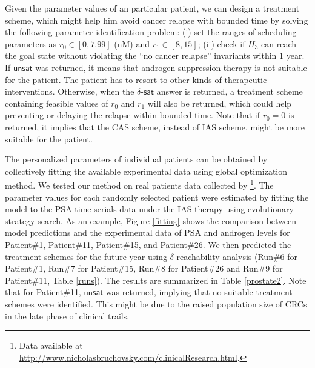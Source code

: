 Given the parameter values of an particular patient, we can design a treatment scheme, which might help him avoid cancer relapse with bounded time by solving the following parameter identification problem: (i) set the ranges of scheduling parameters as $r_0 \in [0,7.99]$ (nM) and $r_1 \in [8,15]$; (ii) check if $H_3$ can reach the goal state without violating the ``no cancer relapse'' invariants within $1$ year. If $\mathsf{unsat}$ was returned, it means that androgen suppression therapy is not suitable for the patient. The patient has to resort to other kinds of therapeutic interventions. Otherwise, when the $\delta$-$\mathsf{sat}$ answer is returned, a treatment scheme containing feasible values of $r_0$ and $r_1$ will also be returned, which could help preventing or delaying the relapse within bounded time. Note that if $r_0=0$ is returned, it implies that the CAS scheme, instead of IAS scheme, might be more suitable for the patient.

The personalized parameters of individual patients can be obtained by collectively fitting the available experimental data using global optimization method. %
%
We tested our method on real patients data collected by \cite{bruchovsky07}\footnote{Data available at \url{http://www.nicholasbruchovsky.com/clinicalResearch.html}.}. The parameter values for each randomly selected patient were estimated by fitting the model to the PSA time serials data under the IAS therapy using evolutionary strategy search. As an example, Figure \ref{fitting} shows the comparison between model predictions and the experimental data of PSA and androgen levels for Patient\#1, Patient\#11, Patient\#15, and Patient\#26. We then predicted the treatment schemes for the future year using $\delta$-reachability analysis (Run\#6 for Patient\#1, Run\#7 for Patient\#15, Run\#8 for Patient\#26 and Run\#9 for Patient\#11, Table \ref{runs}). The results are summarized in Table \ref{prostate2}. Note that for Patient\#11, $\mathsf{unsat}$ was returned, implying that no suitable treatment schemes were identified. This might be due to the raised population size of CRCs in the late phase of clinical trails. 

